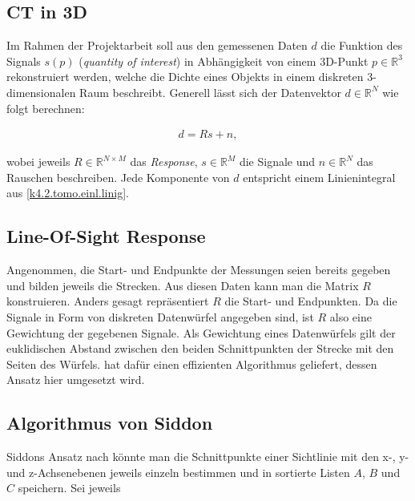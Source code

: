 \documentclass[]{dsadokumentation}
\begin{document}
\subsection{CT in 3D}

Im Rahmen der Projektarbeit soll aus den gemessenen Daten $d$ die Funktion des Signals $s(p)$ (\emph{quantity of interest}) in Abhängigkeit von einem 3D-Punkt $p \in \mathbb{R}^3$ rekonstruiert werden, welche die Dichte eines Objekts in einem diskreten 3-dimensionalen Raum beschreibt. Generell lässt sich der Datenvektor $d \in \mathbb{R}^N$ wie folgt berechnen:

\begin{equation}
  \begin{aligned}
    d = Rs + n,
  \end{aligned}
\end{equation}

wobei jeweils $R \in \mathbb{R}^{N \times M}$ das \emph{Response}, $s \in \mathbb{R}^M$ die Signale und $n \in \mathbb{R}^N$ das Rauschen beschreiben. Jede Komponente von $d$ entspricht einem Linienintegral aus \cref{k4.2.tomo.einl.linig}.

\subsection{Line-Of-Sight Response}

Angenommen, die Start- und Endpunkte der Messungen seien bereits gegeben und bilden jeweils die Strecken. Aus diesen Daten kann man die Matrix $R$ konstruieren. Anders gesagt repräsentiert $R$ die Start- und Endpunkten. Da die Signale in Form von diskreten Datenwürfel angegeben sind, ist $R$ also eine Gewichtung der gegebenen Signale. Als Gewichtung eines Datenwürfels gilt der euklidischen Abstand zwischen den beiden Schnittpunkten der Strecke mit den Seiten des Würfels. \textcite{k4.2.siddon} hat dafür einen effizienten Algorithmus geliefert, dessen Ansatz hier umgesetzt wird.

\subsection{Algorithmus von Siddon}

Siddons Ansatz nach könnte man die Schnittpunkte einer Sichtlinie mit den x-, y- und z-Achsenebenen jeweils einzeln bestimmen und in sortierte Listen $A$, $B$ und $C$ speichern. Sei jeweils
\end{document}
